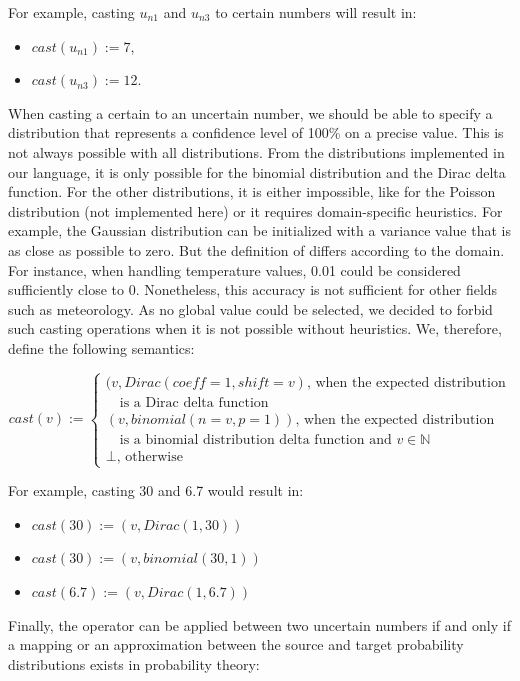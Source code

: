 For example, casting $u_{n1}$ and $u_{n3}$ to certain numbers will result in:
\begin{itemize}
	\item $cast(u_{n1}) := 7$,
	\item $cast(u_{n3}) := 12$.
\end{itemize}

When casting a certain to an uncertain number, we should be able to specify a distribution that represents a confidence level of 100\% on a precise value.
This is not always possible with all distributions.
From the distributions implemented in our language, it is only possible for the binomial distribution and the Dirac delta function.
For the other distributions, it is either impossible, like for the Poisson distribution (not implemented here) or it requires domain-specific heuristics.
For example, the Gaussian distribution can be initialized with a variance value that is as close as possible to zero.
But the definition of  differs according to the domain. 
For instance, when handling temperature values, 0.01 could be considered sufficiently close to 0.
Nonetheless, this accuracy is not sufficient for other fields such as meteorology.
As no global value could be selected, we decided to forbid such casting operations when it is not possible without heuristics.
We, therefore, define the following semantics:

$$cast(v) := \begin{cases}
						(v, Dirac(coeff=1, shift=v) \text{, when the expected distribution} \\
						\text{~~ is a Dirac delta function}\\
						(v, binomial(n=v, p=1)) \text{, when the expected distribution}\\
						\text{~~ is a binomial distribution delta function and $v \in \mathds{N}$}\\
						\perp \text{, otherwise}
					\end{cases}$$

For example, casting 30 and 6.7 would result in:
\begin{itemize}
	\item $cast(30) := (v, Dirac(1, 30))$
	\item $cast(30) := (v, binomial(30, 1))$
	\item $cast(6.7) := (v, Dirac(1, 6.7))$
\end{itemize}

Finally, the operator can be applied between two uncertain numbers if and only if a mapping or an approximation  between the source and target probability distributions exists in probability theory:

